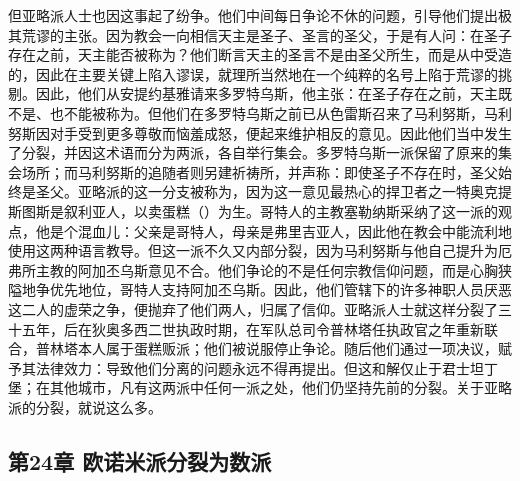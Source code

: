 但亚略派人士也因这事起了纷争。他们中间每日争论不休的问题，引导他们提出极其荒谬的主张。因为教会一向相信天主是圣子、圣言的圣父，于是有人问：在圣子存在之前，天主能否被称为？他们断言天主的圣言不是由圣父所生，而是从中受造的，因此在主要关键上陷入谬误，就理所当然地在一个纯粹的名号上陷于荒谬的挑剔。因此，他们从安提约基雅请来多罗特乌斯，他主张：在圣子存在之前，天主既不是、也不能被称为。但他们在多罗特乌斯之前已从色雷斯召来了马利努斯，马利努斯因对手受到更多尊敬而恼羞成怒，便起来维护相反的意见。因此他们当中发生了分裂，并因这术语而分为两派，各自举行集会。多罗特乌斯一派保留了原来的集会场所；而马利努斯的追随者则另建祈祷所，并声称：即使圣子不存在时，圣父始终是圣父。亚略派的这一分支被称为，因为这一意见最热心的捍卫者之一特奥克提斯图斯是叙利亚人，以卖蛋糕（）为生。哥特人的主教塞勒纳斯采纳了这一派的观点，他是个混血儿：父亲是哥特人，母亲是弗里吉亚人，因此他在教会中能流利地使用这两种语言教导。但这一派不久又内部分裂，因为马利努斯与他自己提升为厄弗所主教的阿加丕乌斯意见不合。他们争论的不是任何宗教信仰问题，而是心胸狭隘地争优先地位，哥特人支持阿加丕乌斯。因此，他们管辖下的许多神职人员厌恶这二人的虚荣之争，便抛弃了他们两人，归属了信仰。亚略派人士就这样分裂了三十五年，后在狄奥多西二世执政时期，在军队总司令普林塔任执政官之年重新联合，普林塔本人属于蛋糕贩派；他们被说服停止争论。随后他们通过一项决议，赋予其法律效力：导致他们分离的问题永远不得再提出。但这和解仅止于君士坦丁堡；在其他城市，凡有这两派中任何一派之处，他们仍坚持先前的分裂。关于亚略派的分裂，就说这么多。\par


\subsection{第24章 欧诺米派分裂为数派}

